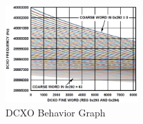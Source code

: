 \begin{figure}[htbp]
    \centering
    \includegraphics[width=0.45\textwidth]{./figures/dcxo_graph}
    \caption{ DCXO Behavior Graph
    \label{fig:dcxo}}
\end{figure}

%
%
%
%
%

